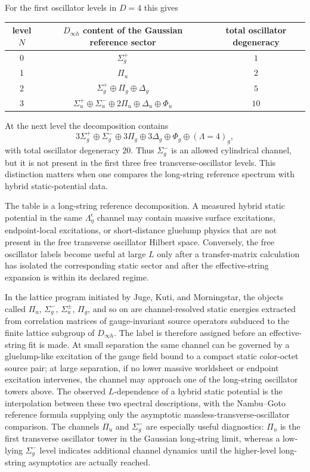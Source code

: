 For the first oscillator levels in \(D=4\) this gives
\begin{center}
\begin{tabular}{c|c|c}
level \(N\) & \(D_{\infty h}\) content of the Gaussian reference sector
& total oscillator degeneracy\\
\hline
0 & \(\Sigma_g^+\) & \(1\)\\
1 & \(\Pi_u\) & \(2\)\\
2 & \(\Sigma_g^+\oplus\Pi_g\oplus\Delta_g\) & \(5\)\\
3 &
\(\Sigma_u^+\oplus\Sigma_u^-\oplus2\Pi_u\oplus\Delta_u\oplus\Phi_u\)
& \(10\)
\end{tabular}
\end{center}
At the next level the decomposition contains
\[
  3\Sigma_g^+\oplus\Sigma_g^-
  \oplus3\Pi_g\oplus3\Delta_g\oplus\Phi_g\oplus(\Lambda=4)_g,
\]
with total oscillator degeneracy \(20\).  Thus \(\Sigma_g^-\) is an allowed
cylindrical channel, but it is not present in the first three free
transverse-oscillator levels.  This distinction matters when one compares the
long-string reference spectrum with hybrid static-potential data.

The table is a long-string reference decomposition.  A measured hybrid static
potential in the same \(\Lambda_\eta^\epsilon\) channel may contain massive
surface excitations, endpoint-local excitations, or short-distance gluelump
physics that are not present in the free transverse oscillator Hilbert space.
Conversely, the free oscillator labels become useful at large \(L\) only
after a transfer-matrix calculation has isolated the corresponding static
sector and after the effective-string expansion is within its declared
regime.

In the lattice program initiated by Juge, Kuti, and Morningstar, the objects
called \(\Pi_u\), \(\Sigma_g^-\), \(\Sigma_u^\pm\), \(\Pi_g\), and so on are
channel-resolved static energies extracted from correlation matrices of
gauge-invariant source operators subduced to the finite lattice subgroup of
\(D_{\infty h}\).  The label is therefore assigned before an effective-string
fit is made.  At small separation the same channel can be governed by a
gluelump-like excitation of the gauge field bound to a compact static
color-octet source pair; at large separation, if no lower massive worldsheet
or endpoint excitation intervenes, the channel may approach one of the
long-string oscillator towers above.  The observed \(L\)-dependence of a
hybrid static potential is the interpolation between these two spectral
descriptions, with the Nambu--Goto reference formula supplying only the
asymptotic massless-transverse-oscillator comparison.
The channels \(\Pi_u\) and \(\Sigma_g^-\) are especially useful diagnostics:
\(\Pi_u\) is the first transverse oscillator tower in the Gaussian
long-string limit, whereas a low-lying \(\Sigma_g^-\) level indicates
additional channel dynamics until the higher-level long-string asymptotics are
actually reached.


